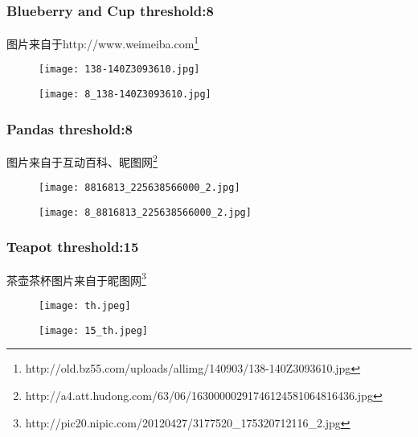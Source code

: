 \documentclass[a4paper,UTF8,11pt]{article}
\numberwithin{equation}{section}
\begin{document}
\subsubsection{Blueberry and Cup  threshold:8}
图片来自于http://www.weimeiba.com\footnote{http://old.bz55.com/uploads/allimg/140903/138-140Z3093610.jpg}
\begin{figure}[h]
\centering
\begin{minipage}[t]{0.48\textwidth}
\centering
\texttt{[image: 138-140Z3093610.jpg]}
\end{minipage}
\begin{minipage}[t]{0.48\textwidth}
\centering
\texttt{[image: 8\_138-140Z3093610.jpg]}
\end{minipage}
\end{figure}

\newpage
\subsubsection{Pandas  threshold:8}
图片来自于互动百科、昵图网\footnote{http://a4.att.hudong.com/63/06/16300000291746124581064816436.jpg}
\begin{figure}[h]
\centering
\begin{minipage}[t]{0.48\textwidth}
\centering
\texttt{[image: 8816813\_225638566000\_2.jpg]}
\end{minipage}
\begin{minipage}[t]{0.48\textwidth}
\centering
\texttt{[image: 8\_8816813\_225638566000\_2.jpg]}
\end{minipage}
\end{figure}

\subsubsection{Teapot  threshold:15}
茶壶茶杯图片来自于昵图网\footnote{http://pic20.nipic.com/20120427/3177520\_175320712116\_2.jpg}
\begin{figure}[h]
\centering
\begin{minipage}[t]{0.48\textwidth}
\centering
\texttt{[image: th.jpeg]}
\end{minipage}
\begin{minipage}[t]{0.48\textwidth}
\centering
\texttt{[image: 15\_th.jpeg]}
\end{minipage}
\end{figure}
\end{document}
